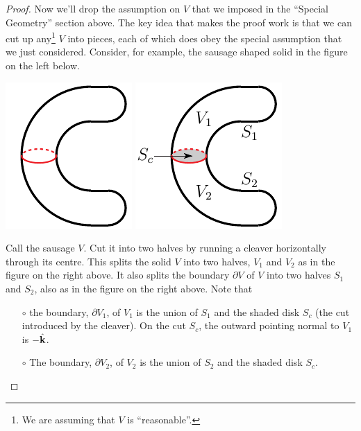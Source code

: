 \begin{proof}
Now we'll drop the assumption on $V$ that we imposed in the ``Special 
Geometry'' section above. The key idea that makes the proof work 
is that we can cut up any\footnote{We are assuming that $V$ is
``reasonable''.} $V$ into pieces, each of which does obey the 
special assumption that we just considered. Consider, for example, 
the sausage shaped solid in the figure on the left below.
\begin{nfig}
\begin{center}
    \includegraphics{divGenA.pdf}\qquad\qquad
    \includegraphics{divGen.pdf}
\end{center}
\end{nfig}
Call the sausage $V$.
Cut it into two halves by running a cleaver horizontally through its
centre. This splits the solid $V$ into two halves, $V_1$ and $V_2$
as in the figure on the right above. It also splits the boundary $\partial V$
of $V$ into two halves $S_1$ and $S_2$, also as in the figure on
the right above. Note that
\begin{itemize}\itemsep1pt \parskip0pt  %
\item[$\circ$]
the boundary, $\partial V_1$, of $V_1$ is the union of $S_1$
and the shaded disk $S_c$ (the cut introduced by the cleaver). 
On the cut $S_c$, the outward pointing normal to $V_1$ is $-\hat{\mathbf{k}}$.
\item[$\circ$]
The boundary, $\partial V_2$, of $V_2$ is the union of $S_2$
and the shaded disk $S_c$. 

\end{itemize}
\end{proof}
